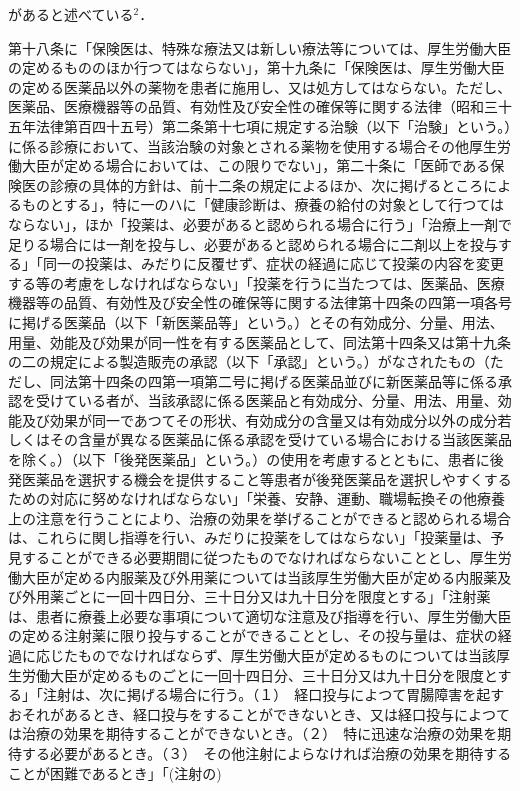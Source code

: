 \documentclass[11pt,dvipdfmx,uplatex]{jsarticle}
\begin{document}
があると述べている$^2$．


第十八条に「保険医は、特殊な療法又は新しい療法等については、厚生労働大臣の定めるもののほか行つてはならない」，第十九条に「保険医は、厚生労働大臣の定める医薬品以外の薬物を患者に施用し、又は処方してはならない。ただし、医薬品、医療機器等の品質、有効性及び安全性の確保等に関する法律（昭和三十五年法律第百四十五号）第二条第十七項に規定する治験（以下「治験」という。）に係る診療において、当該治験の対象とされる薬物を使用する場合その他厚生労働大臣が定める場合においては、この限りでない」，第二十条に「医師である保険医の診療の具体的方針は、前十二条の規定によるほか、次に掲げるところによるものとする」，特に一のハに「健康診断は、療養の給付の対象として行つてはならない」，ほか「投薬は、必要があると認められる場合に行う」「治療上一剤で足りる場合には一剤を投与し、必要があると認められる場合に二剤以上を投与する」「同一の投薬は、みだりに反覆せず、症状の経過に応じて投薬の内容を変更する等の考慮をしなければならない」「投薬を行うに当たつては、医薬品、医療機器等の品質、有効性及び安全性の確保等に関する法律第十四条の四第一項各号に掲げる医薬品（以下「新医薬品等」という。）とその有効成分、分量、用法、用量、効能及び効果が同一性を有する医薬品として、同法第十四条又は第十九条の二の規定による製造販売の承認（以下「承認」という。）がなされたもの（ただし、同法第十四条の四第一項第二号に掲げる医薬品並びに新医薬品等に係る承認を受けている者が、当該承認に係る医薬品と有効成分、分量、用法、用量、効能及び効果が同一であつてその形状、有効成分の含量又は有効成分以外の成分若しくはその含量が異なる医薬品に係る承認を受けている場合における当該医薬品を除く。）（以下「後発医薬品」という。）の使用を考慮するとともに、患者に後発医薬品を選択する機会を提供すること等患者が後発医薬品を選択しやすくするための対応に努めなければならない」「栄養、安静、運動、職場転換その他療養上の注意を行うことにより、治療の効果を挙げることができると認められる場合は、これらに関し指導を行い、みだりに投薬をしてはならない」「投薬量は、予見することができる必要期間に従つたものでなければならないこととし、厚生労働大臣が定める内服薬及び外用薬については当該厚生労働大臣が定める内服薬及び外用薬ごとに一回十四日分、三十日分又は九十日分を限度とする」「注射薬は、患者に療養上必要な事項について適切な注意及び指導を行い、厚生労働大臣の定める注射薬に限り投与することができることとし、その投与量は、症状の経過に応じたものでなければならず、厚生労働大臣が定めるものについては当該厚生労働大臣が定めるものごとに一回十四日分、三十日分又は九十日分を限度とする」「注射は、次に掲げる場合に行う。（１）　経口投与によつて胃腸障害を起すおそれがあるとき、経口投与をすることができないとき、又は経口投与によつては治療の効果を期待することができないとき。（２）　特に迅速な治療の効果を期待する必要があるとき。（３）　その他注射によらなければ治療の効果を期待することが困難であるとき」「(注射の) 
\end{document}
